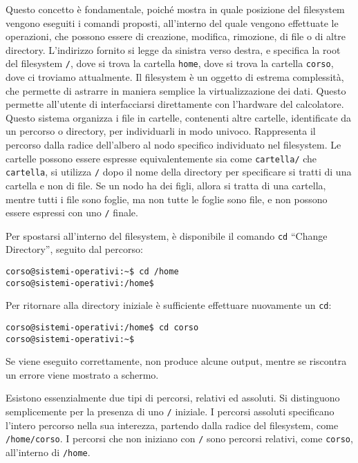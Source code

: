 \documentclass{article}
\numberwithin{equation}{subsection}
\begin{document}
Questo concetto è fondamentale, poiché mostra in quale posizione del filesystem vengono eseguiti i comandi proposti, all'interno del quale vengono effettuate le operazioni, che possono essere di creazione, modifica, 
rimozione, di file o di altre directory. 
L'indirizzo fornito si legge da sinistra verso destra, e specifica la root del filesystem \verb|/|, dove si trova la cartella \verb|home|, dove si trova la cartella \verb|corso|, dove ci troviamo attualmente. 
Il filesystem è un oggetto di estrema complessità, che permette di astrarre in maniera semplice la virtualizzazione dei dati. Questo permette all'utente di interfacciarsi direttamente con l'hardware del calcolatore. 
Questo sistema organizza i file in cartelle, contenenti altre cartelle, identificate da un percorso o directory, per individuarli in modo univoco. Rappresenta il percorso dalla radice dell'albero al nodo specifico 
individuato nel filesystem. Le cartelle possono essere espresse equivalentemente sia come \verb|cartella/| che \verb|cartella|, si utilizza \verb|/| dopo il nome della directory per specificare si tratti di una 
cartella e non di file. Se un nodo ha dei figli, allora si tratta di una cartella, mentre tutti i file sono foglie, ma non tutte le foglie sono file, e non possono essere espressi con uno \verb|/| finale. 


Per spostarsi all'interno del filesystem, è disponibile il comando \verb|cd| ``Change Directory'', seguito dal percorso:
\begin{verbatim}
corso@sistemi-operativi:~$ cd /home
corso@sistemi-operativi:/home$
\end{verbatim}
Per ritornare alla directory iniziale è sufficiente effettuare nuovamente un \verb|cd|:
\begin{verbatim}
corso@sistemi-operativi:/home$ cd corso
corso@sistemi-operativi:~$
\end{verbatim}
    
Se viene eseguito correttamente, non produce alcune output, mentre se riscontra un errore viene mostrato a schermo. 


Esistono essenzialmente due tipi di percorsi, relativi ed assoluti. Si distinguono semplicemente per la presenza di uno \verb|/| iniziale. I percorsi assoluti specificano l'intero percorso nella sua interezza, 
partendo dalla radice del filesystem, come \verb|/home/corso|. I percorsi che non iniziano con \verb|/| sono percorsi relativi, come \verb|corso|, all'interno di \verb|/home|. 
\end{document}
